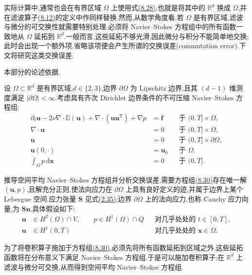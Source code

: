 \begin{note}
\label{note:les-bounded-domain-practical-computations}
实际计算中,通常也会在有界区域 $\Omega$ 上使用式\hyperref[eq:space-averaged-navier-stokes-full-space]{(8.28)},也就是将其中的 $\mathbb{R}^d$ 换成 $\Omega$,并在滤波算子\hyperref[eq:space-average-convolution]{(8.12)}的定义中作同样替换.然而,从数学角度看,若 $\Omega$ 是有界区域,滤波与微分的可交换性就需要特别处理.必须将 Navier--Stokes 方程组中的所有函数一致地从 $\Omega$ 延拓到 $\mathbb{R}^d$.一般而言,这些延拓不够光滑,因此微分与积分不能简单地交换;此时会出现一个额外项.省略该项便会产生所谓的交换误差(commutation error).下文将研究这类交换误差.

本部分的论述依据\textcite{DuncaJohnLayton2004}.
\end{note}

\begin{note}[问题的设置]
\label{note:les-bounded-domain-problem-setup}
设 $\Omega\subset\mathbb{R}^d$ 是有界区域,$d\in\{2,3\}$,边界 $\partial\Omega$ 为 Lipschitz 边界,且其 $(d-1)$ 维测度满足 $|\partial\Omega|<\infty$.考虑具有齐次 Dirichlet 边界条件的不可压缩 Navier--Stokes 方程组:
\begin{equation}\label{eq:les-bounded-domain-ns}
\begin{aligned}
 \partial_t\bm{u}
  -2\nu\nabla\cdot\mathbb{D}(\bm{u})
  +\nabla\cdot(\bm{u}\bm{u}^{\mathsf T})
  +\nabla p
   &=\bm{f}
      &&\text{于 }(0,T]\times\Omega,\\
 \nabla\cdot\bm{u}
   &=0
      &&\text{于 }(0,T]\times\Omega,\\
 \bm{u}
   &=0
      &&\text{于 }(0,T]\times\partial\Omega,\\
 \bm{u}(0,\cdot)
   &=\bm{u}_0
      &&\text{于 }\Omega,\\
 \int_\Omega p\,\mathrm{d}\bm{x}
   &=0
      &&\text{于 }(0,T].
\end{aligned}
\end{equation}

推导空间平均 Navier--Stokes 方程组并分析交换误差,需要方程组\hyperref[eq:les-bounded-domain-ns]{(8.30)}存在唯一解 $(\bm{u},p)$,且解充分正则,使法向应力在 $\partial\Omega$ 上具有良好定义的迹,并属于边界上某个 Lebesgue 空间.应力张量 $\bm{S}$ 见式\hyperref[eq:dimensionless-stress-tensor]{(2.35)};边界 $\partial\Omega$ 上的法向应力,也称 Cauchy 应力向量,为 $\bm{S}\bm{n}$.具体假设如下:
\begin{equation}\label{eq:les-bounded-domain-regularity}
\begin{aligned}
 \bm{u}&\in H^2(\Omega)\cap V,\qquad
 p\in H^1(\Omega)\cap Q
 &&\text{对几乎处处的 }t\in[0,T],\\
 \bm{u}&\in H^1(0,T)
 &&\text{对几乎处处的 }\bm{x}\in\Omega.
\end{aligned}
\end{equation}

为了将卷积算子施加于方程组\hyperref[eq:les-bounded-domain-ns]{(8.30)},必须先将所有函数延拓到区域之外.这些延拓函数将在分布意义下满足 Navier--Stokes 方程组.于是可以施加卷积算子;在 $\mathbb{R}^d$ 上滤波与微分可交换,从而得到空间平均 Navier--Stokes 方程组.
\end{note}

